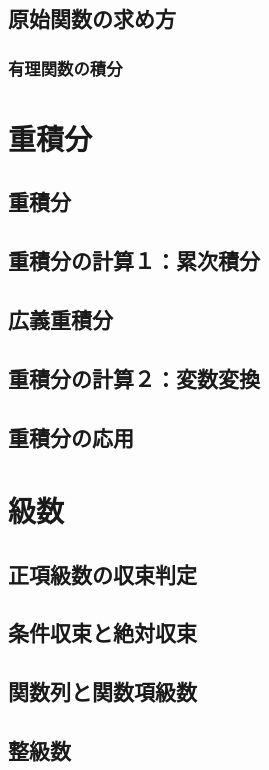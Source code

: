\documentclass[uplatex, dvipdfmx]{jsreport}
\begin{document}
\section{原始関数の求め方}

\subsection{有理関数の積分}


\begin{shadebox}
    \begin{theorem}[部分分数展開]
        
    \end{theorem}
\end{shadebox}

\chapter{重積分}

\section{重積分}

\section{重積分の計算１：累次積分}

\section{広義重積分}

\section{重積分の計算２：変数変換}

\section{重積分の応用}

\chapter{級数}

\section{正項級数の収束判定}

\section{条件収束と絶対収束}

\section{関数列と関数項級数}

\section{整級数}
\end{document}
